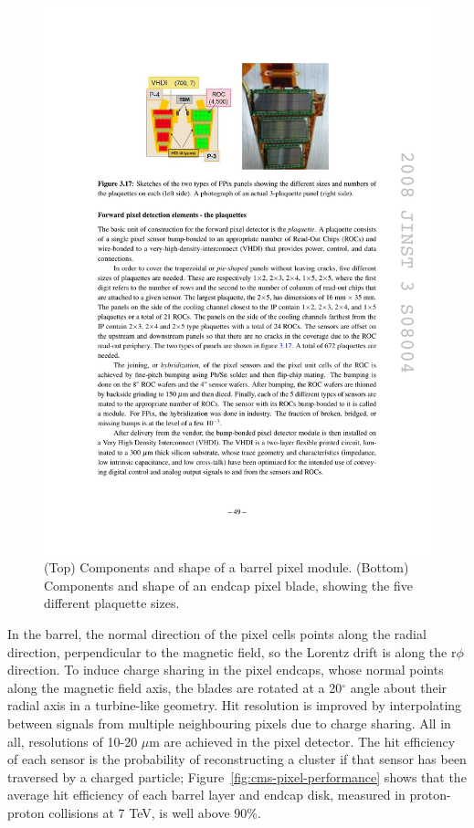 \begin{figure}[hbtp]
\begin{center}
    \includegraphics[width=2.0\cmsFigWidth]{figures/cms-pixel-fpixmodule}
    \caption{(Top) Components and shape of a barrel pixel module. (Bottom) Components and shape of an endcap pixel blade, showing the five different plaquette sizes. ~\cite{1748-0221-3-08-S08004}}
    \label{fig:cms-pixel-modules}
  \end{center}
\end{figure}
 
In the barrel, the normal direction of the pixel cells points along the radial direction, perpendicular to the magnetic field, so the Lorentz drift is along the r$\phi$ direction. To induce charge sharing in the pixel endcaps, whose normal points along the magnetic field axis, the blades are rotated at a 20$^{\circ}$ angle about their radial axis in a turbine-like geometry. Hit resolution is improved by interpolating between signals from multiple neighbouring pixels due to charge sharing. All in all, resolutions of 10-20 $\mu$m are achieved in the pixel detector. The hit efficiency of each sensor is the probability of reconstructing a cluster if that sensor has been traversed by a charged particle; Figure~\ref{fig:cms-pixel-performance} shows that the average hit efficiency of each barrel layer and endcap disk, measured in proton-proton collisions at 7 TeV, is well above 90\%.

